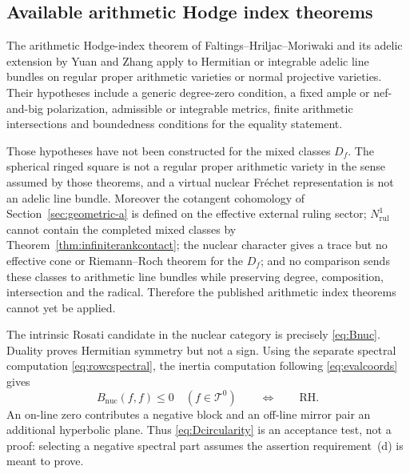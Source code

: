 \documentclass[11pt]{amsart}
\theoremstyle{definition}
\theoremstyle{remark}
\newcommand{\RH}{\mathrm{RH}}
\begin{document}
\subsection{Available arithmetic Hodge index theorems}

The arithmetic Hodge-index theorem of Faltings--Hriljac--Moriwaki and its
adelic extension by Yuan and Zhang \cite[Theorems~1.1 and~1.3]{YuanZhang}
apply to Hermitian or integrable adelic line bundles on regular proper
arithmetic varieties or normal projective varieties.  Their hypotheses
include a generic degree-zero condition, a fixed ample or nef-and-big
polarization, admissible or integrable metrics, finite arithmetic
intersections and boundedness conditions for the equality statement.

Those hypotheses have not been constructed for the mixed classes $D_f$.
The spherical ringed square is not a regular proper arithmetic variety in
the sense assumed by those theorems, and a virtual nuclear Fr\'echet
representation is not an adelic line bundle.  Moreover the cotangent
cohomology of Section~\ref{sec:geometric-a} is defined on the effective
external ruling sector; $N^1_{\mathrm{rul}}$ cannot contain the completed
mixed classes by Theorem~\ref{thm:infiniterankcontact}; the nuclear character
gives a trace but no effective cone or Riemann--Roch theorem for the $D_f$;
and no comparison sends these classes to arithmetic line bundles while
preserving degree, composition, intersection and the radical.
Therefore the published arithmetic index theorems cannot yet be applied.

The intrinsic Rosati candidate in the nuclear category is precisely
\eqref{eq:Bnuc}.  Duality proves Hermitian symmetry but not a sign.  Using
the separate spectral computation \eqref{eq:rowcspectral}, the inertia
computation following \eqref{eq:evalcoords} gives
\begin{equation}\label{eq:Dcircularity}
 B_{\mathrm{nuc}}(f,f)\le0\quad(f\in\mathcal T^0)
 \qquad\Longleftrightarrow\qquad \RH.
\end{equation}
An on-line zero contributes a negative block and an off-line mirror pair an
additional hyperbolic plane.  Thus \eqref{eq:Dcircularity} is an acceptance
test, not a proof: selecting a negative spectral part assumes the assertion
requirement~(d) is meant to prove.
\end{document}

